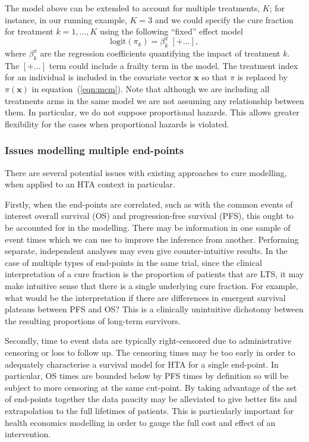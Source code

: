 \documentclass[AMA,STIX1COL]{WileyNJD-v2}
\begin{document}
The model above can be extended to account for multiple treatments, $K$; for instance, in our running example, $K=3$ and we could specify the cure fraction for treatment $k=1,\ldots,K$ using the following ``fixed'' effect model
\begin{equation}
\label{eqn:pi_regn}
\mbox{logit}(\pi_{k}) = \beta^{\pi}_{k} \; [+ \ldots],
\end{equation}
\noindent
where $\beta^{\pi}_k$ are the regression coefficients quantifying the impact of treatment $k$.
The $[+ \ldots]$ term could include a frailty term in the model.
The treatment index for an individual is included in the covariate vector $\bm{x}$ so that $\pi$ is replaced by $\pi(\bm{x})$ in equation~(\ref{eqn:mcm}).
Note that although we are including all treatments arms in the same model we are not assuming any relationship between them. In particular, we do not suppose proportional hazards. This allows greater flexibility for the cases when proportional hazards is violated.

\subsubsection{Issues modelling multiple end-points} \label{section:issues}
There are several potential issues with existing approaches to cure modelling, when applied to an HTA context in particular.

Firstly, when the end-points are correlated, such as with the common events of interest overall survival (OS) and progression-free survival (PFS), this ought to be accounted for in the modelling.
There may be information in one sample of event times which we can use to improve the inference from another.
Performing separate, independent analyses may even give counter-intuitive results.
In the case of multiple types of end-points in the same trial, since the clinical interpretation of a cure fraction is the proportion of patients that are LTS,
it may make intuitive sense that there is a single underlying cure fraction.
For example, what would be the interpretation if there are differences in emergent survival plateaus between PFS and OS?
This is a clinically unintuitive dichotomy between the resulting proportions of long-term survivors.

Secondly, time to event data are typically right-censored due to administrative censoring or loss to follow up.
The censoring times may be too early in order to adequately characterise a survival model for HTA for a single end-point.
In particular, OS times are bounded below by PFS times by definition so will be subject to more censoring at the same cut-point.
By taking advantage of the set of end-points together the data paucity may be alleviated to give better fits and extrapolation to the full lifetimes of patients.
This is particularly important for health economics modelling in order to gauge the full cost and effect of an intervention.
\end{document}
